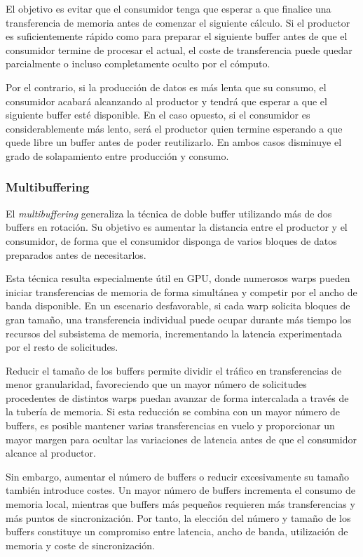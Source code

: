 El objetivo es evitar que el consumidor tenga que esperar a que finalice una transferencia de memoria antes de comenzar el siguiente cálculo. Si el productor es suficientemente rápido como para preparar el siguiente buffer antes de que el consumidor termine de procesar el actual, el coste de transferencia puede quedar parcialmente o incluso completamente oculto por el cómputo.

Por el contrario, si la producción de datos es más lenta que su consumo, el consumidor acabará alcanzando al productor y tendrá que esperar a que el siguiente buffer esté disponible. En el caso opuesto, si el consumidor es considerablemente más lento, será el productor quien termine esperando a que quede libre un buffer antes de poder reutilizarlo. En ambos casos disminuye el grado de solapamiento entre producción y consumo.

\subsubsection{Multibuffering}

El \textit{multibuffering} generaliza la técnica de doble buffer utilizando más de dos buffers en rotación. Su objetivo es aumentar la distancia entre el productor y el consumidor, de forma que el consumidor disponga de varios bloques de datos preparados antes de necesitarlos.

Esta técnica resulta especialmente útil en GPU, donde numerosos warps pueden iniciar transferencias de memoria de forma simultánea y competir por el ancho de banda disponible. En un escenario desfavorable, si cada warp solicita bloques de gran tamaño, una transferencia individual puede ocupar durante más tiempo los recursos del subsistema de memoria, incrementando la latencia experimentada por el resto de solicitudes.

Reducir el tamaño de los buffers permite dividir el tráfico en transferencias de menor granularidad, favoreciendo que un mayor número de solicitudes procedentes de distintos warps puedan avanzar de forma intercalada a través de la tubería de memoria. Si esta reducción se combina con un mayor número de buffers, es posible mantener varias transferencias en vuelo y proporcionar un mayor margen para ocultar las variaciones de latencia antes de que el consumidor alcance al productor.

Sin embargo, aumentar el número de buffers o reducir excesivamente su tamaño también introduce costes. Un mayor número de buffers incrementa el consumo de memoria local, mientras que buffers más pequeños requieren más transferencias y más puntos de sincronización. Por tanto, la elección del número y tamaño de los buffers constituye un compromiso entre latencia, ancho de banda, utilización de memoria y coste de sincronización.


